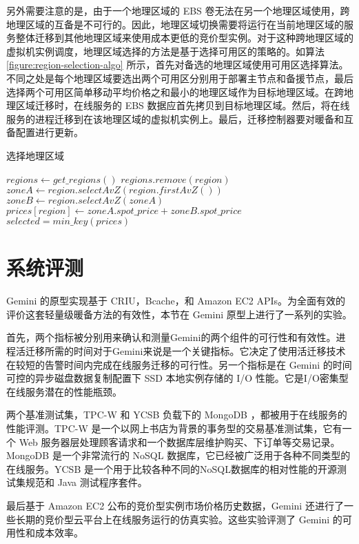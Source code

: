 另外需要注意的是，由于一个地理区域的 EBS 卷无法在另一个地理区域使用，跨地理区域的互备是不可行的。因此，地理区域切换需要将运行在当前地理区域的服务整体迁移到其他地理区域来使用成本更低的竞价型实例。对于这种跨地理区域的虚拟机实例调度，地理区域选择的方法是基于选择可用区的策略的。如算法 \ref{figure:region-selection-algo} 所示，首先对备选的地理区域使用可用区选择算法。不同之处是每个地理区域要选出两个可用区分别用于部署主节点和备援节点，最后选择两个可用区简单移动平均价格之和最小的地理区域作为目标地理区域。在跨地理区域迁移时，在线服务的 EBS 数据应首先拷贝到目标地理区域。然后，将在线服务的进程迁移到在该地理区域的虚拟机实例上。最后，迁移控制器要对暖备和互备配置进行更新。

\begin{algorithm}
\caption{选择地理区域}
\label{figure:region-selection-algo}

$regions\gets get\_regions()$\;
{
  {
    $regions.remove(region)$\;
  }
}
{
  $zoneA\gets region.selectAvZ(region.firstAvZ())$\;
  $zoneB\gets region.selectAvZ(zoneA)$\;
  $prices[region]\gets zoneA.spot\_price + zoneB.spot\_price$\;
}
$selected = min\_key(prices)$\;
\end{algorithm}

\section{系统评测}
Gemini 的原型实现基于 CRIU，Bcache，和 Amazon EC2 APIs。为全面有效的评价这套轻量级暖备方法的有效性，本节在 Gemini 原型上进行了一系列的实验。

首先，两个指标被分别用来确认和测量Gemini的两个组件的可行性和有效性。进程活迁移所需的时间对于Gemini来说是一个关键指标。它决定了使用活迁移技术在较短的告警时间内完成在线服务迁移的可行性。另一个指标是在 Gemini 的时间可控的异步磁盘数据复制配置下 SSD 本地实例存储的 I/O 性能。它是I/O密集型在线服务潜在的性能瓶颈。

两个基准测试集，TPC-W \cite{TPCW:2014} 和 YCSB \cite{YCSB:2014} 负载下的 MongoDB \cite{Mongodb:2014}，都被用于在线服务的性能评测。TPC-W 是一个以网上书店为背景的事务型的交易基准测试集，它有一个 Web 服务器层处理顾客请求和一个数据库层维护购买、下订单等交易记录。MongoDB 是一个非常流行的 NoSQL 数据库，它已经被广泛用于各种不同类型的在线服务。YCSB 是一个用于比较各种不同的NoSQL数据库的相对性能的开源测试集规范和 Java 测试程序套件。

最后基于 Amazon EC2 公布的竞价型实例市场价格历史数据，Gemini 还进行了一些长期的竞价型云平台上在线服务运行的仿真实验。这些实验评测了 Gemini 的可用性和成本效率。

